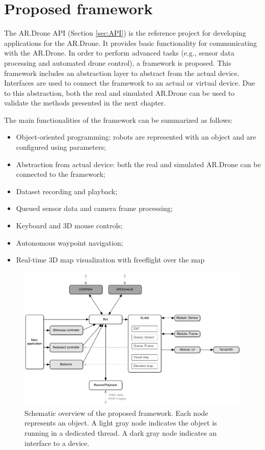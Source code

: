 \section{Proposed framework}
\label{sec:proposed-framework}
The AR.Drone API (Section \ref{sec:API}) is the reference project for developing applications for the AR.Drone.
It provides basic functionality for communicating with the AR.Drone.
In order to perform advanced tasks (e.g., sensor data processing and automated drone control), a framework is proposed.
This framework includes an abstraction layer to abstract from the actual device.
Interfaces are used to connect the framework to an actual or virtual device.
Due to this abstraction, both the real and simulated AR.Drone can be used to validate the methods presented in the next chapter.

The main functionalities of the framework can be summarized as follows:
\begin{itemize}
\item Object-oriented programming: robots are represented with an object and are configured using \mbox{parameters};
\item Abstraction from actual device: both the real and simulated AR.Drone can be connected to the framework;
\item Dataset recording and playback;
\item Queued sensor data and camera frame processing;
\item Keyboard and 3D mouse controls;
\item Autonomous waypoint navigation;
\item Real-time 3D map visualization with freeflight over the map
\end{itemize}

\begin{figure}[htb!]
\centering
\includegraphics[width=\linewidth]{images/framework.pdf}
\caption{Schematic overview of the proposed framework. Each node represents an object. A light gray node indicates the object is running in a dedicated thread. A dark gray node indicates an interface to a device.} 
\label{fig:proposed_framework_schematic}
\end{figure}

